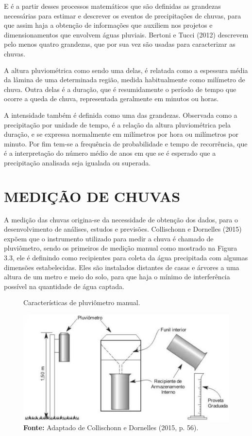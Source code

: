E é a partir desses processos matemáticos que são definidas as grandezas necessárias para estimar e descrever os eventos de precipitações de chuvas, para que assim haja a obtenção de informações que auxiliem nos projetos e dimensionamentos que envolvem águas pluviais. Bertoni e Tucci (2012) descrevem pelo menos quatro grandezas, que por sua vez são usadas para caracterizar as chuvas.

A altura pluviométrica como sendo uma delas, é relatada como a espessura média da lâmina de uma determinada região, medida habitualmente como milímetro de chuva. Outra delas é a duração, que é resumidamente o período de tempo que ocorre a queda de chuva, representada geralmente em minutos ou horas. 

A intensidade também é definida como uma das grandezas. Observada como a precipitação por unidade de tempo, é a relação da altura pluviométrica pela duração, e se expressa normalmente em milímetros por hora ou milímetros por minuto. Por fim tem-se a frequência de probabilidade e tempo de recorrência, que é a interpretação do número médio de anos em que se é esperado que a precipitação analisada seja igualada ou superada.

\section{MEDIÇÃO DE CHUVAS}

A medição das chuvas origina-se da necessidade de obtenção dos dados, para o desenvolvimento de análises, estudos e previsões. Collischonn e Dornelles (2015) expõem que o instrumento utilizado para medir a chuva é chamado de pluviômetro, sendo os primeiros de medição manual como mostrado na Figura 3.3, ele é definindo como recipientes para coleta da água precipitada com algumas dimensões estabelecidas. Eles são instalados distantes de casas e árvores a uma altura de um metro e meio do solo, para que haja o mínimo de interferência possível na quantidade de água captada.\bigskip

\begin{figure}[!ht]
	\centering
	\caption{Características de pluviômetro manual.}
	\includegraphics[width=.7625\linewidth]{figuras/caracteristicas_de_um_pluviometro_de_leitura_manual.png}
	\caption*{\textbf{Fonte:} Adaptado de Collischonn e Dornelles (2015, p. 56).}
	\label{fig:caracteristicas_de_um_pluviometro_de_leitura_manual.png}
\end{figure}

